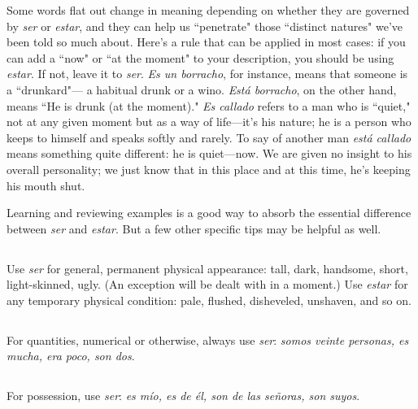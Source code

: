 Some words flat out change in meaning depending on whether
they are governed by \emph{ser} or \emph{estar}, and they can help us ``penetrate"
those ``distinct natures" we've been told so much about. Here's a rule
that can be applied in most cases: if you can add a ``now" or ``at the moment" to your description, you should be using \emph{estar}. If not, leave it to
\emph{ser}. \emph{Es un borracho}, for instance, means that someone is a ``drunkard"---
a habitual drunk or a wino. \emph{Está borracho}, on the other hand, means
``He is drunk (at the moment)." \emph{Es callado} refers to a man who is
``quiet," not at any given moment but as a way of life---it's his nature;
he is a person who keeps to himself and speaks softly and rarely. To say
of another man \emph{está callado} means something quite different: he is
quiet---now. We are given no insight to his overall personality; we just
know that in this place and at this time, he's keeping his mouth shut.

Learning and reviewing examples is a good way to absorb the
essential difference between \emph{ser} and \emph{estar}. But a few other specific tips
may be helpful as well.

\subsection{}

Use \emph{ser} for general, permanent physical appearance: tall,
dark, handsome, short, light-skinned, ugly. (An exception will be dealt
with in a moment.) Use \emph{estar} for any temporary physical condition:
pale, flushed, disheveled, unshaven, and so on.

\subsection{}

For quantities, numerical or otherwise, always use \emph{ser}: \emph{somos veinte personas, es mucha, era poco, son dos}.

\subsection{}

For possession, use \emph{ser}: \emph{es mío, es de él, son de las señoras,
son suyos}.

\subsection{}

